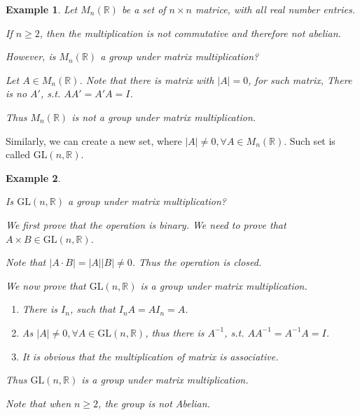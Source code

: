 \documentclass{article}
\theoremstyle{MyNonumberplain}
\theoremstyle{break}
\theoremstyle{break}
\newtheorem{example}{Example}[section]
\theoremstyle{break}
\theoremstyle{definition}
\theoremstyle{break}
\begin{document}
\begin{expbox}
    \begin{example}
        Let $M_n (\mathbb{R})$ be a set of $n \times n$ matrice, with all real number entries.\bigskip

        If $n \geq 2$, then the multiplication is not commutative and therefore not abelian.\bigskip

        However, is $M_n (\mathbb{R})$ a group under matrix multiplication?

        \begin{ansbox}
            Let $A \in M_n (\mathbb{R})$. Note that there is matrix with $| A | = 0$, for such matrix, There is no
            $A'$, s.t. $A A' = A' A = I$.\bigskip
    
            Thus $M_n (\mathbb{R})$ is not a group under matrix multiplication.    
        \end{ansbox}

    
    \end{example}
\end{expbox}

Similarly, we can create a new set, where $| A | \neq 0, \forall A \in M_n
(\mathbb{R})$. Such set is called $\text{GL} (n, \mathbb{R})$.

\begin{expbox}
    \begin{example}
        \begin{example*}
            Is $\text{GL} (n, \mathbb{R})$ a group under matrix multiplication?
            \begin{ansbox}
                We first prove that the operation is binary. We need to prove that $A \times
                B \in \text{GL} (n, \mathbb{R})$.\bigskip
                
                Note that $| A \cdot B | = | A | | B | \neq 0$. Thus the operation is closed.\bigskip
                
                We now prove that $\text{GL} (n, \mathbb{R})$ is a group under matrix
                multiplication.\bigskip
                \begin{enumerate}
                  \item There is $I_n$, such that $I_n A = A I_n = A$.\bigskip
                  
                  \item As $| A | \neq 0, \forall A \in \text{GL} (n, \mathbb{R})$, thus
                  there is $A^{- 1}$, s.t. $A A^{- 1} = A^{- 1} A = I$.\bigskip
                  
                  \item It is obvious that the multiplication of matrix is associative.\bigskip
                \end{enumerate}
                Thus $\text{GL} (n, \mathbb{R})$ is a group under matrix multiplication.\bigskip
            \end{ansbox}
            Note that when $n \geq 2$, the group is not Abelian.
          \end{example*}
    \end{example}
\end{expbox}
\end{document}
